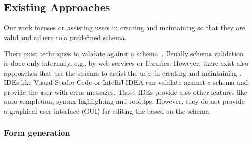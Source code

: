







\subsection{Existing Approaches}\label{subsec:existing-approaches}
Our work focuses on assisting users in creating and maintaining \cfgfiles{} so that they are valid and adhere to a predefined schema.

There exist techniques to validate \cfgfiles{} against a schema~\cite{JSON_schema_vailidation,JSONValidation,baeldung_2023}.
Usually schema validation is done only internally, e.g., by web services or libraries.
However, there exist also approaches that use the schema to assist the user in creating and maintaining \cfgfiles.
IDEs like Visual Studio Code or IntelliJ IDEA can validate \cfgfiles{} against a schema and provide the user with error messages.
Those IDEs provide also other features like auto-completion, syntax highlighting and tooltips.
However, they do not provide a graphical user interface (GUI) for editing the \cfgfiles{} based on the schema.


\subsubsection{Form generation}\label{subsubsec:schema-to-gui}

